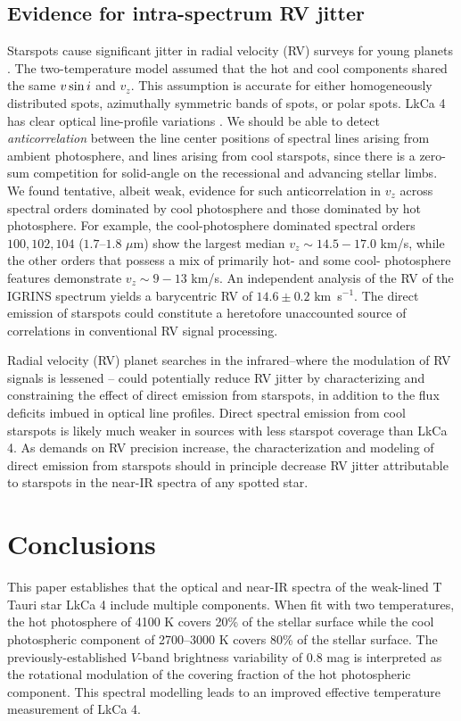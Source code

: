 \documentclass[twocolumn]{emulateapj}%
\begin{document}


\subsection{Evidence for intra-spectrum RV jitter}
Starspots cause significant jitter in radial velocity (RV) surveys for young planets \citep[e.g.][]{donati14, robertson14}.  The two-temperature model assumed that the hot and cool components shared the same $v \sin i$ and $v_z$.  This assumption is accurate for either homogeneously distributed spots, azimuthally symmetric bands of spots, or polar spots.  LkCa 4 has clear optical line-profile variations \citep{nguyen12, donati14}.  We should be able to detect \emph{anticorrelation} between the line center positions of spectral lines arising from ambient photosphere, and lines arising from cool starspots, since there is a zero-sum competition for solid-angle on the recessional and advancing stellar limbs.  We found tentative, albeit weak, evidence for such anticorrelation in $v_z$ across spectral orders dominated by cool photosphere and those dominated by hot photosphere.  For example, the cool-photosphere dominated spectral orders $100, 102, 104$ ($1.7$--$1.8$ $\mu$m) show the largest median $v_z\sim14.5-17.0$ km/s, while the other orders that possess a mix of primarily hot- and some cool- photosphere features demonstrate $v_z\sim9-13$ km/s.  An independent analysis of the RV of the IGRINS spectrum yields a barycentric RV of $14.6\pm0.2$ km~s$^{-1}$.  The direct emission of starspots could constitute a heretofore unaccounted source of correlations in conventional RV signal processing.

Radial velocity (RV) planet searches in the infrared--where the modulation of RV signals is lessened \citep[\emph{e.g.}][]{prato08,crockett12}-- could potentially reduce RV jitter by characterizing and constraining the effect of direct emission from starspots, in addition to the flux deficits imbued in optical line profiles.  Direct spectral emission from cool starspots is likely much weaker in sources with less starspot coverage than LkCa 4.  As demands on RV precision increase, the characterization and modeling of direct emission from starspots should in principle decrease RV jitter attributable to starspots in the near-IR spectra of any spotted star.


\section{Conclusions}
This paper establishes that the optical and near-IR spectra of the weak-lined T Tauri star LkCa 4 include multiple components.  When fit with two temperatures, the hot photosphere of 4100 K covers 20\% of the stellar surface while the cool photospheric component of 2700--3000 K covers 80\% of the stellar surface.  The previously-established $V$-band brightness variability of $0.8$ mag is interpreted as the rotational modulation of the covering fraction of the hot photospheric component.  This spectral modelling leads to an improved effective temperature measurement of LkCa 4.
\end{document}
